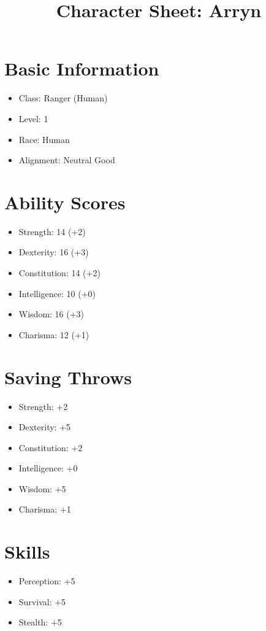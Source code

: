 \documentclass{article}
\title{Character Sheet: Arryn}
\author{}
\date{}
\begin{document}
\maketitle

\section{Basic Information}
\begin{itemize}
\item Class: Ranger (Human)
\item Level: 1
\item Race: Human
\item Alignment: Neutral Good
\end{itemize}

\section{Ability Scores}
\begin{itemize}
\item Strength: 14 (+2)
\item Dexterity: 16 (+3)
\item Constitution: 14 (+2)
\item Intelligence: 10 (+0)
\item Wisdom: 16 (+3)
\item Charisma: 12 (+1)
\end{itemize}

\section{Saving Throws}
\begin{itemize}
\item Strength: +2
\item Dexterity: +5
\item Constitution: +2
\item Intelligence: +0
\item Wisdom: +5
\item Charisma: +1
\end{itemize}

\section{Skills}
\begin{itemize}
\item Perception: +5
\item Survival: +5
\item Stealth: +5
\end{itemize}
\end{document}

